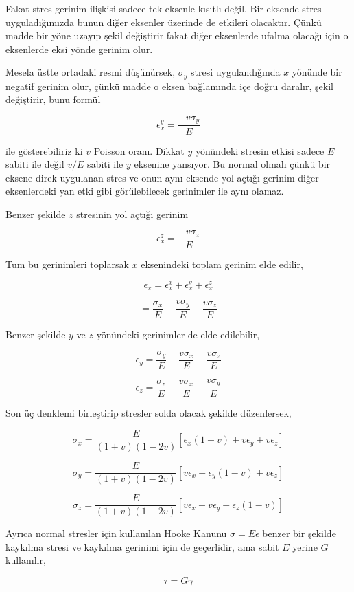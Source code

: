 \documentclass[12pt,fleqn]{article}\usepackage{../../common}
\begin{document}
Fakat stres-gerinim ilişkisi sadece tek eksenle kısıtlı değil. Bir eksende stres
uyguladığımızda bunun diğer eksenler üzerinde de etkileri olacaktır.  Çünkü
madde bir yöne uzayıp şekil değiştirir fakat diğer eksenlerde ufalma olacağı
için o eksenlerde eksi yönde gerinim olur.

Mesela üstte ortadaki resmi düşünürsek, $\sigma_y$ stresi uygulandığında $x$
yönünde bir negatif gerinim olur, çünkü madde o eksen bağlamında içe doğru
daralır, şekil değiştirir, bunu formül

$$
\epsilon_x^y =  \frac{- v \sigma_y}{E}
$$

ile gösterebiliriz ki $v$ Poisson oranı. Dikkat $y$ yönündeki stresin etkisi
sadece $E$ sabiti ile değil $v/E$ sabiti ile $y$ eksenine yansıyor. Bu normal
olmalı çünkü bir eksene direk uygulanan stres ve onun aynı eksende yol açtığı
gerinim diğer eksenlerdeki yan etki gibi görülebilecek gerinimler ile aynı
olamaz.

Benzer şekilde $z$ stresinin yol açtığı gerinim

$$
\epsilon_x^z =  \frac{- v \sigma_z}{E}
$$

Tum bu gerinimleri toplarsak $x$ eksenindeki toplam gerinim elde edilir,

$$
\epsilon_x = \epsilon_x^x + \epsilon_x^y + \epsilon_x^z
$$

$$
= \frac{\sigma_x}{E} - \frac{v \sigma_y}{E} - \frac{v \sigma_z}{E} 
$$

Benzer şekilde $y$ ve $z$ yönündeki gerinimler de elde edilebilir,

$$
\epsilon_y = \frac{\sigma_y}{E} - \frac{v \sigma_x}{E} - \frac{v \sigma_z}{E} 
$$

$$
\epsilon_z = \frac{\sigma_z}{E} - \frac{v \sigma_x}{E} - \frac{v \sigma_y}{E} 
$$

Son üç denklemi birleştirip stresler solda olacak şekilde düzenlersek,

$$
\sigma_x = \frac{E}{(1+v)(1-2v)} [\epsilon_x (1-v) + v \epsilon_y + v \epsilon_z ]
$$

$$
\sigma_y = \frac{E}{(1+v)(1-2v)} [ v \epsilon_x + \epsilon_y (1-v) + v \epsilon_z  ]
$$

$$
\sigma_z = \frac{E}{(1+v)(1-2v)} [v \epsilon_x + v \epsilon_y + \epsilon_z (1-v)  ]
$$

Ayrıca normal stresler için kullanılan Hooke Kanunu $\sigma = E \epsilon$ benzer
bir şekilde kaykılma stresi ve kaykılma gerinimi için de geçerlidir, ama sabit
$E$ yerine $G$ kullanılır,

$$
\tau = G \gamma
$$
\end{document}
